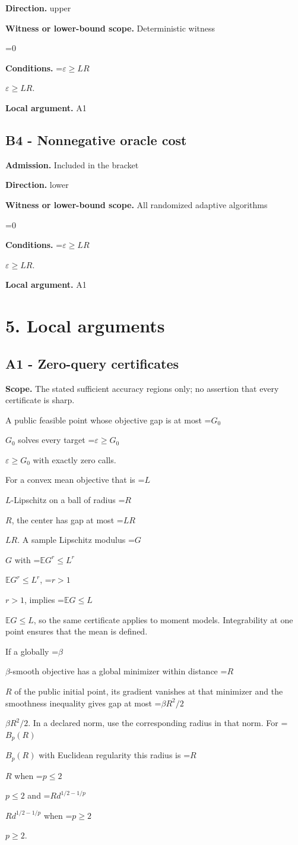 \documentclass[10pt,a4paper]{article}
\newcommand{\AtlasMath}[1]{\par\begingroup\centering\setbox0=\hbox{$\displaystyle #1$}\ifdim\wd0>1.4\linewidth\typeout{ATLAS WIDE FORMULA: \the\wd0}\fi\ifdim\wd0>\linewidth\resizebox{\linewidth}{!}{\box0}\else\box0\fi\par\endgroup}
\newcommand{\AtlasInlineMath}[1]{\begingroup\setbox0=\hbox{$#1$}\ifdim\wd0>.4\linewidth\endgroup\AtlasMath{#1}\else\endgroup$#1$\fi}
\begin{document}
\textbf{Direction.} upper

\textbf{Witness or lower-bound scope.} Deterministic witness

\AtlasMath{0}
\textbf{Conditions.} \AtlasInlineMath{\varepsilon\ge LR}.

\textbf{Local argument.} A1

\subsection{B4 - Nonnegative oracle cost}
\textbf{Admission.} Included in the bracket

\textbf{Direction.} lower

\textbf{Witness or lower-bound scope.} All randomized adaptive algorithms

\AtlasMath{0}
\textbf{Conditions.} \AtlasInlineMath{\varepsilon\ge LR}.

\textbf{Local argument.} A1

\section{5. Local arguments}
\subsection{A1 - Zero-query certificates}
\textbf{Scope.} The stated sufficient accuracy regions only; no assertion that every certificate is sharp.

A public feasible point whose objective gap is at most \AtlasInlineMath{G_0} solves every target \AtlasInlineMath{\varepsilon\ge G_0} with exactly zero calls.

For a convex mean objective that is \AtlasInlineMath{L}-Lipschitz on a ball of radius \AtlasInlineMath{R}, the center has gap at most \AtlasInlineMath{LR}. A sample Lipschitz modulus \AtlasInlineMath{G} with \AtlasInlineMath{\mathbb E G^r\le L^r}, \AtlasInlineMath{r>1}, implies \AtlasInlineMath{\mathbb E G\le L}, so the same certificate applies to moment models. Integrability at one point ensures that the mean is defined.

If a globally \AtlasInlineMath{\beta}-smooth objective has a global minimizer within distance \AtlasInlineMath{R} of the public initial point, its gradient vanishes at that minimizer and the smoothness inequality gives gap at most \AtlasInlineMath{\beta R^2/2}. In a declared norm, use the corresponding radius in that norm. For \AtlasInlineMath{B_p(R)} with Euclidean regularity this radius is \AtlasInlineMath{R} when \AtlasInlineMath{p\le2} and \AtlasInlineMath{R d^{1/2-1/p}} when \AtlasInlineMath{p\ge2}.
\end{document}
